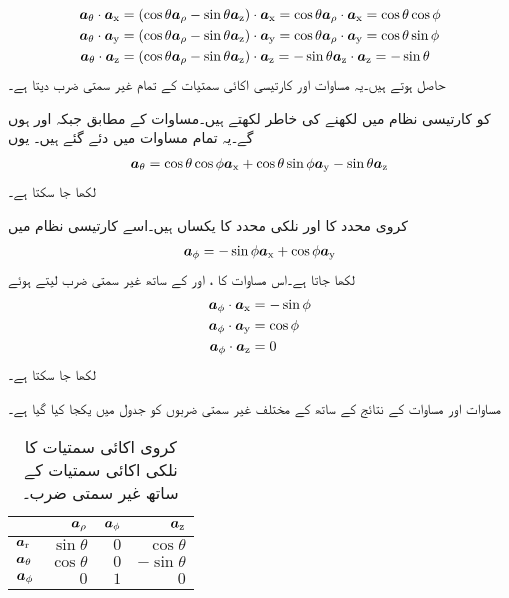\begin{gather}
\begin{aligned}\label{مساوات_سمتیہ_کروی_تھیٹا_کے_کارتیسی_اجزاء}
\atheta \cdot \ax&=(\cos \theta \arho-\sin \theta \az) \cdot \ax=\cos \theta \arho \cdot \ax=\cos \theta \cos \phi\\
\atheta \cdot \ay&=(\cos \theta \arho-\sin \theta \az) \cdot \ay=\cos \theta \arho \cdot \ay=\cos \theta \sin \phi \\
\atheta \cdot \az&=(\cos \theta \arho-\sin \theta \az) \cdot \az=-\sin \theta \az \cdot \az=-\sin \theta
\end{aligned}
\end{gather}
حاصل ہوتے ہیں۔یہ مساوات  اور کارتیسی اکائی سمتیات کے تمام غیر سمتی ضرب دیتا ہے۔

 کو کارتیسی نظام میں لکھنے کی خاطر  لکھتے ہیں۔مساوات  کے مطابق  جبکہ  اور  ہوں گے۔یہ تمام  مساوات  میں دئے گئے ہیں۔ یوں
\begin{align}
\atheta=\cos \theta \cos \phi \ax+\cos \theta \sin \phi\ay-\sin \theta\az
\end{align}
لکھا جا سکتا ہے۔

کروی  محدد کا  اور نلکی محدد کا  یکساں ہیں۔اسے کارتیسی نظام میں
\begin{align}
\aphi=-\sin \phi \ax+\cos \phi \ay
\end{align}
لکھا جاتا ہے۔اس مساوات کا ،  اور  کے ساتھ غیر سمتی ضرب لیتے ہوئے
\begin{gather}
\begin{aligned}
\aphi \cdot \ax&=-\sin \phi\\
\aphi \cdot \ay&=\cos \phi\\
\aphi \cdot \az&=0
\end{aligned}
\end{gather}
لکھا جا سکتا ہے۔

مساوات  اور مساوات  کے نتائج کے ساتھ  کے مختلف غیر سمتی ضربوں کو جدول  میں یکجا کیا گیا ہے۔

\begin{table}
\caption{کروی  اکائی سمتیات کا نلکی اکائی سمتیات کے ساتھ غیر سمتی ضرب۔}
\centering
\begin{tabular}{l | r r r}
 & $\arho$ & $\aphi$ & $\az$ \\
\hline
$\ar$ & $\sin \theta$ & $0$& $\cos \theta$\\
$\atheta$ &$\cos \theta$ &$ 0$ &$ -\sin \theta$\\
$\aphi$ & $0$ &$ 1$ &$0$
\end{tabular}
\label{جدول_سمتیہ_کروی_نلکی_اکائی_غیر-سمتی_ضرب}
\end{table}
%

